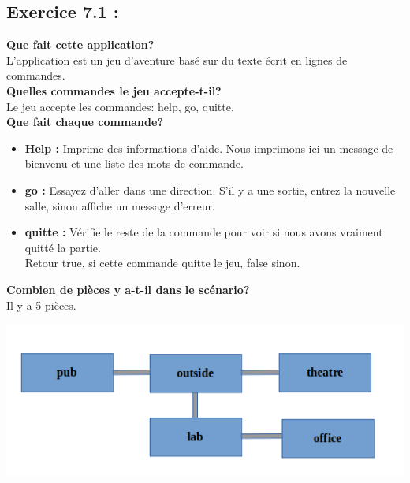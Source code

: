 \documentclass[french,10pt,a4paper]{report}
\begin{document}
\subsection{\textcolor{bb}{Exercice 7.1 :}}
\textbf{Que fait cette application?}\\
L’application est un jeu d’aventure basé sur du texte écrit  en lignes de commandes.\\
\textbf{Quelles commandes le jeu accepte-t-il?}\\
Le jeu accepte les commandes: help, go, quitte.\\
\textbf{Que fait chaque commande?}
\begin{itemize}
\item \textbf{Help :} Imprime des informations d'aide. Nous imprimons ici un message de bienvenu et une liste des
	mots de commande.
\item \textbf{go :} Essayez d'aller dans une direction. S'il y a une sortie, entrez la nouvelle salle, 	sinon affiche un message d'erreur.
\item \textbf{quitte :} Vérifie le reste de la commande pour voir si nous avons vraiment quitté la partie.\\
	Retour true, si cette commande quitte le jeu, false sinon.
\end{itemize}
\textbf{Combien de pièces y a-t-il dans le scénario?}\\
Il y a  5 pièces.
\begin{center}
	\includegraphics[scale=0.5]{captures/it1_1.png}
\end{center}
\end{document}
